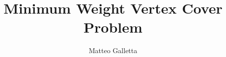 \documentclass[12pt,a4paper,openany,oneside]{book}
\begin{document}


\title{Minimum Weight Vertex Cover Problem}
\author{Matteo Galletta}

\tableofcontents






\newpage
{}

\end{document}

